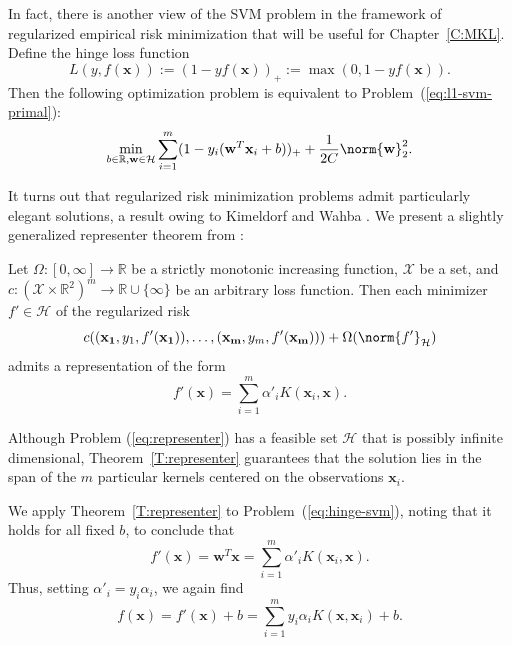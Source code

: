 In fact, there is another view of the SVM problem in the framework of regularized
empirical risk minimization that will be useful for Chapter~\ref{C:MKL}.
Define the hinge loss function
\begin{equation*}
  L(y, f(\mathbf{x})) := (1 - yf(\mathbf{x}))_+ := \max(0, 1 - yf(\mathbf{x})).
\end{equation*}
Then the following optimization problem is equivalent to Problem~(\ref{eq:l1-svm-primal}):
\begin{equation}
  \label{eq:hinge-svm}
  \min_{b \in \mathbb{R}, \mathbf{w} \in \mathcal{H}} \sum_{i=1}^m (1 - y_i(\mathbf{w}^T\mathbf{x}_i + b))_+ +
  \frac{1}{2C} \norm{\mathbf{w}}_2^2.
\end{equation}

It turns out that regularized risk minimization problems admit particularly elegant
solutions, a result owing to Kimeldorf and Wahba \cite{kimeldorf1971some}.  We
present a slightly generalized representer theorem from \cite{scholkopf2002learning}:
\begin{theorem}
  \label{T:representer}
  Let $\Omega:[0, \infty] \to \mathbb{R}$ be a strictly monotonic increasing function,
  $\mathcal{X}$ be a set, and $c: (\mathcal{X} \times \mathbb{R}^2)^m \to \mathbb{R} \cup \{\infty\}$
  be an arbitrary loss function.  Then each minimizer $f' \in \mathcal{H}$ of the regularized risk
  \begin{equation}
    \label{eq:representer}
    c((\mathbf{x_1}, y_1, f'(\mathbf{x_1})), \ldots, (\mathbf{x_m}, y_m, f'(\mathbf{x_m}))) + \Omega(\norm{f'}_{\mathcal{H}})
  \end{equation}
  admits a representation of the form
  \begin{equation*}
    f'(\mathbf{x}) = \sum_{i=1}^m \alpha'_i K(\mathbf{x}_i, \mathbf{x}).
  \end{equation*}
\end{theorem}
Although Problem (\ref{eq:representer}) has a feasible set $\mathcal{H}$
that is possibly infinite dimensional, Theorem~\ref{T:representer} guarantees
that the solution lies in the span of the $m$ particular kernels centered
on the observations $\mathbf{x}_i$.

We apply Theorem~\ref{T:representer} to Problem~(\ref{eq:hinge-svm}), noting that it holds
for all fixed $b$, to conclude that
\begin{equation*}
  f'(\mathbf{x}) = \mathbf{w}^T\mathbf{x} = \sum_{i=1}^m \alpha'_i K(\mathbf{x}_i, \mathbf{x}).
\end{equation*}
Thus, setting $\alpha'_i = y_i \alpha_i$, we again find
\begin{equation*}
  f(\mathbf{x}) = f'(\mathbf{x}) + b = \sum_{i=1}^m y_i \alpha_i K(\mathbf{x}, \mathbf{x}_i) + b.
\end{equation*}

